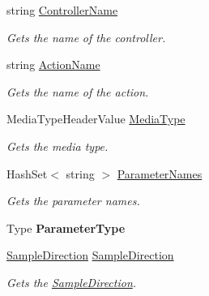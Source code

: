 \begin{DoxyCompactItemize}
\item 
string \hyperlink{class_w_s1aarsproeve_1_1_areas_1_1_help_page_1_1_help_page_sample_key_a6d46b214a46fe71b0d7529c37191aa4f}{Controller\+Name}
\begin{DoxyCompactList}\small\item\em Gets the name of the controller. \end{DoxyCompactList}\item 
string \hyperlink{class_w_s1aarsproeve_1_1_areas_1_1_help_page_1_1_help_page_sample_key_a04142e3fa553ca3923d5bc56946fc191}{Action\+Name}
\begin{DoxyCompactList}\small\item\em Gets the name of the action. \end{DoxyCompactList}\item 
Media\+Type\+Header\+Value \hyperlink{class_w_s1aarsproeve_1_1_areas_1_1_help_page_1_1_help_page_sample_key_a0f7ca7edc665a4ec1659e060fe66bdff}{Media\+Type}
\begin{DoxyCompactList}\small\item\em Gets the media type. \end{DoxyCompactList}\item 
Hash\+Set$<$ string $>$ \hyperlink{class_w_s1aarsproeve_1_1_areas_1_1_help_page_1_1_help_page_sample_key_a49d37bbf913e01d893ea7a6e2975dcee}{Parameter\+Names}
\begin{DoxyCompactList}\small\item\em Gets the parameter names. \end{DoxyCompactList}\item 
\hypertarget{class_w_s1aarsproeve_1_1_areas_1_1_help_page_1_1_help_page_sample_key_ad77ec60047fa2968b7ce0e167db11b89}{}Type {\bfseries Parameter\+Type}\label{class_w_s1aarsproeve_1_1_areas_1_1_help_page_1_1_help_page_sample_key_ad77ec60047fa2968b7ce0e167db11b89}

\item 
\hyperlink{namespace_w_s1aarsproeve_1_1_areas_1_1_help_page_a68a9a343f44949e9781196ca9699289c}{Sample\+Direction} \hyperlink{class_w_s1aarsproeve_1_1_areas_1_1_help_page_1_1_help_page_sample_key_a4d02725ac4f265d06bfb42d669de3edc}{Sample\+Direction}
\begin{DoxyCompactList}\small\item\em Gets the \hyperlink{class_w_s1aarsproeve_1_1_areas_1_1_help_page_1_1_help_page_sample_key_a4d02725ac4f265d06bfb42d669de3edc}{Sample\+Direction}. \end{DoxyCompactList}\end{DoxyCompactItemize}


